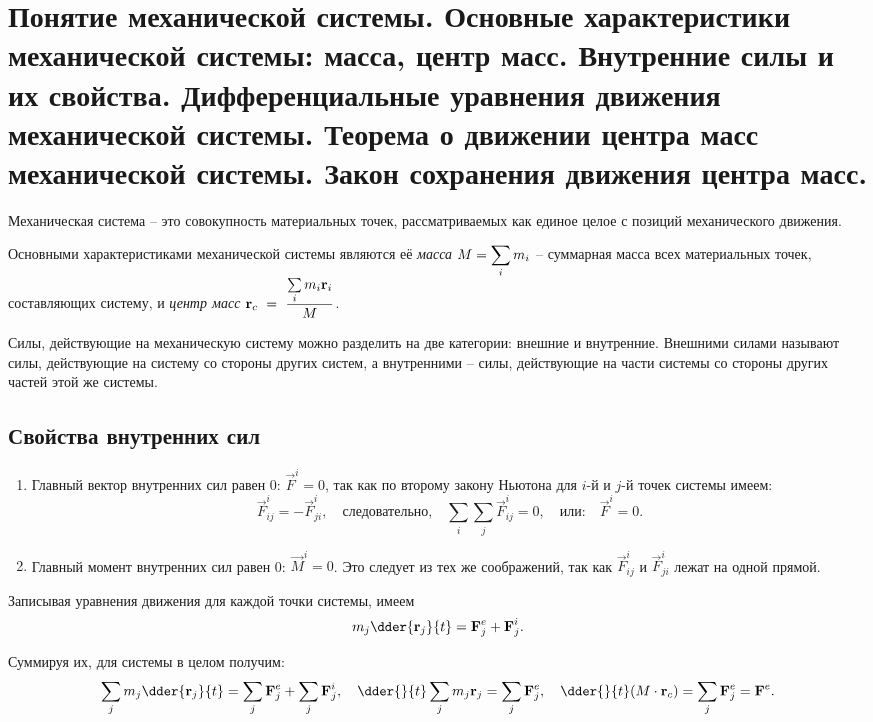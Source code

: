 \chapter{Понятие механической системы. Основные характеристики механической
системы: масса, центр масс. Внутренние силы и их свойства. Дифференциальные
уравнения движения механической системы. Теорема о движении центра масс
механической системы. Закон сохранения движения центра масс.}

Механическая система -- это совокупность материальных точек, рассматриваемых как
единое целое с позиций механического движения.

Основными характеристиками механической системы являются её \emph{масса}
\( \displaystyle M = \sum_i m_i \) -- суммарная масса всех материальных точек,
составляющих систему, и \emph{центр масс} \( \displaystyle \boldsymbol{\mathrm{r}}_c~=~\frac{\sum\limits_i
m_i\boldsymbol{\mathrm{r}}_i}{M} \).

Силы, действующие на механическую систему можно разделить на две категории:
внешние и внутренние. Внешними силами называют силы, действующие на систему со
стороны других систем, а внутренними -- силы, действующие на части системы со
стороны других частей этой же системы.

\section{Свойства внутренних сил}
\begin{enumerate}
    \item Главный вектор внутренних сил равен 0: \( \vec{F}^i = 0 \), так
    как по второму закону Ньютона для \( i \)-й и \( j \)-й точек системы имеем:
    \[
        \vec{F}^i_{ij} = -\vec{F}^i_{ji}, \quad \text{следовательно,}\quad
        \sum_i\sum_j \vec{F}^i_{ij} = 0, \quad \text{или:} \quad
        \vec{F}^i = 0.
    \]
    
    \item Главный момент внутренних сил равен 0: \( \vec{M}^i = 0 \). Это
    следует из тех же соображений, так как \( \vec{F}^i_{ij} \) и
    \( \vec{F}^i_{ji} \) лежат на одной прямой.
\end{enumerate}


Записывая уравнения движения для каждой точки системы, имеем
\[
    m_j \dder{\vec{r}_j}{t} = \vec{F}^e_j + \vec{F}^i_j.
\]

Суммируя их, для системы в целом получим:
\[
    \sum_j m_j \dder{\vec{r}_j}{t} = \sum_j\vec{F}^e_j + \sum_j\vec{F}^i_j,\quad
    \dder{}{t}\sum_j m_j \vec{r}_j = \sum_j \vec{F}^e_j, \quad
    \dder{}{t}(M\cdot\vec{r}_c) = \sum_j \vec{F}^e_j = \vec{F}^e.
\]

